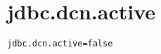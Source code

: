 \section{jdbc.dcn.active}
\label{configuration:JdbcDcnActive}
\AvailableInJavaOnly{\TODO}
\begin{lstlisting}[style=Props,caption={Usage example for \textit{jdbc.dcn.active}}]
jdbc.dcn.active=false
\end{lstlisting}